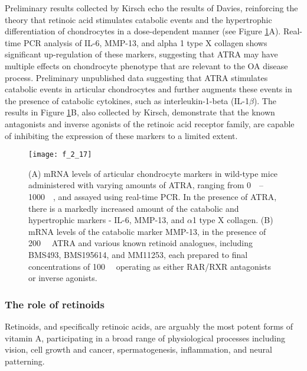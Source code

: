 \begin{refsection}
Preliminary results collected by Kirsch echo the results of Davies, reinforcing
the theory that retinoic acid stimulates catabolic events and the hypertrophic
differentiation of chondrocytes in a dose-dependent manner (see Figure
\ref{fig:kirsch_prelim_results}A). Real-time PCR analysis of IL-6, MMP-13, and
alpha 1 type X collagen shows significant up-regulation of these markers,
suggesting that ATRA may have multiple effects on chondrocyte phenotype that are
relevant to the OA disease process. Preliminary unpublished data suggesting that
ATRA stimulates catabolic events in articular chondrocytes and further augments
these events in the presence of catabolic cytokines, such as interleukin-1-beta
(IL-1${\beta}$). The results in Figure \ref{fig:kirsch_prelim_results}B, also
collected by Kirsch, demonstrate that the known antagonists and inverse agonists
of the retinoic acid receptor family,\cite{DeLera2007} are capable of inhibiting
the expression of these markers to a limited extent. 

\begin{figure}[h!] \centering \texttt{[image: f\_2\_17]}
    \caption{(A) mRNA levels of articular chondrocyte markers in wild-type mice
    administered with varying amounts of ATRA,
    ranging from \SIrange{0}{1000}{\nano\moLar}, and assayed using real-time
    PCR. In the presence of ATRA, there is a markedly increased amount of the
    catabolic and hypertrophic markers - IL-6, MMP-13, and ${\alpha}$1 type X
    collagen. (B) mRNA levels of the catabolic marker MMP-13, in the presence of
    \SI{200}{\nano\moLar} ATRA and various known retinoid analogues, including
    BMS493, BMS195614, and MM11253, each prepared to final concentrations of
    \SI{100}{\nano\moLar} operating as either RAR/RXR antagonists or inverse
    agonists.}
    \label{fig:kirsch_prelim_results} \end{figure}

\subsubsection{The role of retinoids}

Retinoids, and specifically retinoic acids, are arguably the most potent forms
of vitamin A, participating in a broad range of physiological processes
including vision,\cite{Hyatt1996} cell growth and cancer,\cite{Mongan2007}
spermatogenesis,\cite{Vernet2006} inflammation,\cite{Huang2007} and
neural patterning.\cite{Abu-Abed2001}


\end{refsection}
